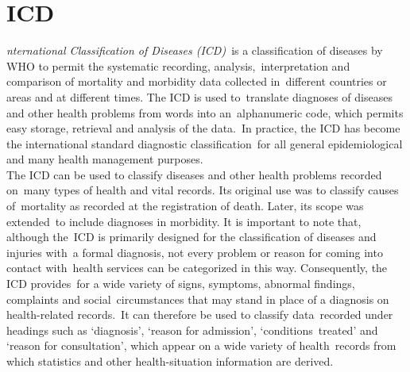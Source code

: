   \section[International Classification of Diseases (ICD) ]{ICD}
  \label{sec:icd}

  \textit{nternational Classification of Diseases (ICD)}\
  is a classification of diseases by WHO to permit the systematic recording, analysis,\
  interpretation and comparison of mortality and morbidity data collected in\
  different countries or areas and at different times. The ICD is used to\
  translate diagnoses of diseases and other health problems from words into an\
  alphanumeric code, which permits easy storage, retrieval and analysis of the data.\
  In practice, the ICD has become the international standard diagnostic classification\
  for all general epidemiological and many health management purposes.\\
  
  \noindent The ICD can be used to classify diseases and other health problems recorded on\
  many types of health and vital records. Its original use was to classify causes of\
  mortality as recorded at the registration of death. Later, its scope was extended\
  to include diagnoses in morbidity. It is important to note that, although the\
  ICD is primarily designed for the classification of diseases and injuries with\
  a formal diagnosis, not every problem or reason for coming into contact with\
  health services can be categorized in this way. Consequently, the ICD provides\
  for a wide variety of signs, symptoms, abnormal findings, complaints and social\
  circumstances that may stand in place of a diagnosis on health-related records.\
  It can therefore be used to classify data\
  recorded under headings such as `diagnosis', `reason for admission', `conditions\
  treated' and `reason for consultation', which appear on a wide variety of health\
  records from which statistics and other health-situation information are derived.\\
  
